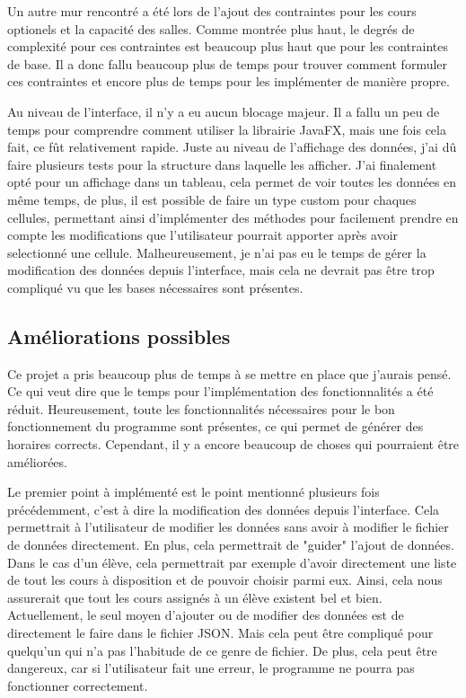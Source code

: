 Un autre mur rencontré a été lors de l'ajout des contraintes pour les cours optionels et la capacité des salles. Comme montrée plus haut, le degrés de complexité pour ces contraintes est beaucoup plus haut que pour les contraintes de base. Il a donc fallu beaucoup plus de temps pour trouver comment formuler ces contraintes et encore plus de temps pour les implémenter de manière propre.

Au niveau de l'interface, il n'y a eu aucun blocage majeur. Il a fallu un peu de temps pour comprendre comment utiliser la librairie JavaFX, mais une fois cela fait, ce fût relativement rapide. Juste au niveau de l'affichage des données, j'ai dû faire plusieurs tests pour la structure dans laquelle les afficher. J'ai finalement opté pour un affichage dans un tableau, cela permet de voir toutes les données en même temps, de plus, il est possible de faire un type custom pour chaques cellules, permettant ainsi d'implémenter des méthodes pour facilement prendre en compte les modifications que l'utilisateur pourrait apporter après avoir selectionné une cellule. Malheureusement, je n'ai pas eu le temps de gérer la modification des données depuis l'interface, mais cela ne devrait pas être trop compliqué vu que les bases nécessaires sont présentes.

\subsection{Améliorations possibles}
Ce projet a pris beaucoup plus de temps à se mettre en place que j'aurais pensé. Ce qui veut dire que le temps pour l'implémentation des fonctionnalités a été réduit. Heureusement, toute les fonctionnalités nécessaires pour le bon fonctionnement du programme sont présentes, ce qui permet de générer des horaires corrects. Cependant, il y a encore beaucoup de choses qui pourraient être améliorées.

Le premier point à implémenté est le point mentionné plusieurs fois précédemment, c'est à dire la modification des données depuis l'interface. Cela permettrait à l'utilisateur de modifier les données sans avoir à modifier le fichier de données directement. En plus, cela permettrait de "guider" l'ajout de données. Dans le cas d'un élève, cela permettrait par exemple d'avoir directement une liste de tout les cours à disposition et de pouvoir choisir parmi eux. Ainsi, cela nous assurerait que tout les cours assignés à un élève existent bel et bien. Actuellement, le seul moyen d'ajouter ou de modifier des données est de directement le faire dans le fichier JSON. Mais cela peut être compliqué pour quelqu'un qui n'a pas l'habitude de ce genre de fichier. De plus, cela peut être dangereux, car si l'utilisateur fait une erreur, le programme ne pourra pas fonctionner correctement.

